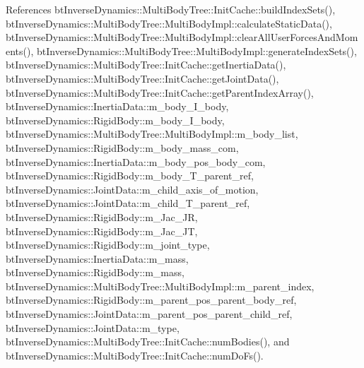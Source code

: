 References btInverseDynamics::MultiBodyTree::InitCache::buildIndexSets(), btInverseDynamics::MultiBodyTree::MultiBodyImpl::calculateStaticData(), btInverseDynamics::MultiBodyTree::MultiBodyImpl::clearAllUserForcesAndMoments(), btInverseDynamics::MultiBodyTree::MultiBodyImpl::generateIndexSets(), btInverseDynamics::MultiBodyTree::InitCache::getInertiaData(), btInverseDynamics::MultiBodyTree::InitCache::getJointData(), btInverseDynamics::MultiBodyTree::InitCache::getParentIndexArray(), btInverseDynamics::InertiaData::m\_\-body\_\-I\_\-body, btInverseDynamics::RigidBody::m\_\-body\_\-I\_\-body, btInverseDynamics::MultiBodyTree::MultiBodyImpl::m\_\-body\_\-list, btInverseDynamics::RigidBody::m\_\-body\_\-mass\_\-com, btInverseDynamics::InertiaData::m\_\-body\_\-pos\_\-body\_\-com, btInverseDynamics::RigidBody::m\_\-body\_\-T\_\-parent\_\-ref, btInverseDynamics::JointData::m\_\-child\_\-axis\_\-of\_\-motion, btInverseDynamics::JointData::m\_\-child\_\-T\_\-parent\_\-ref, btInverseDynamics::RigidBody::m\_\-Jac\_\-JR, btInverseDynamics::RigidBody::m\_\-Jac\_\-JT, btInverseDynamics::RigidBody::m\_\-joint\_\-type, btInverseDynamics::InertiaData::m\_\-mass, btInverseDynamics::RigidBody::m\_\-mass, btInverseDynamics::MultiBodyTree::MultiBodyImpl::m\_\-parent\_\-index, btInverseDynamics::RigidBody::m\_\-parent\_\-pos\_\-parent\_\-body\_\-ref, btInverseDynamics::JointData::m\_\-parent\_\-pos\_\-parent\_\-child\_\-ref, btInverseDynamics::JointData::m\_\-type, btInverseDynamics::MultiBodyTree::InitCache::numBodies(), and btInverseDynamics::MultiBodyTree::InitCache::numDoFs().

